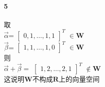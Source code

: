 \documentclass{ctexart}
\begin{document}
    \paragraph{5}
        \begin{mdframed}
            取\\
            $\vec{\alpha}$=
            $\begin{bmatrix}
                0,1,\dots,1,1
            \end{bmatrix}^{T}$
            $\in\mathbf{W}$\\
            $\vec{\beta}$=
            $\begin{bmatrix}
                1,1,\dots,1,0
            \end{bmatrix}^{T}$
            $\in\mathbf{W}$\\
            则\\
            $\vec{\alpha}+\vec{\beta}=$
            $\begin{bmatrix}
                1,2,\dots,2,1
            \end{bmatrix}^{T}$
            $\notin\mathbf{W}$\\
            这说明$\mathbf{W}$不构成$\mathbf{R}$上的向量空间
        \end{mdframed}
            
\end{document}

